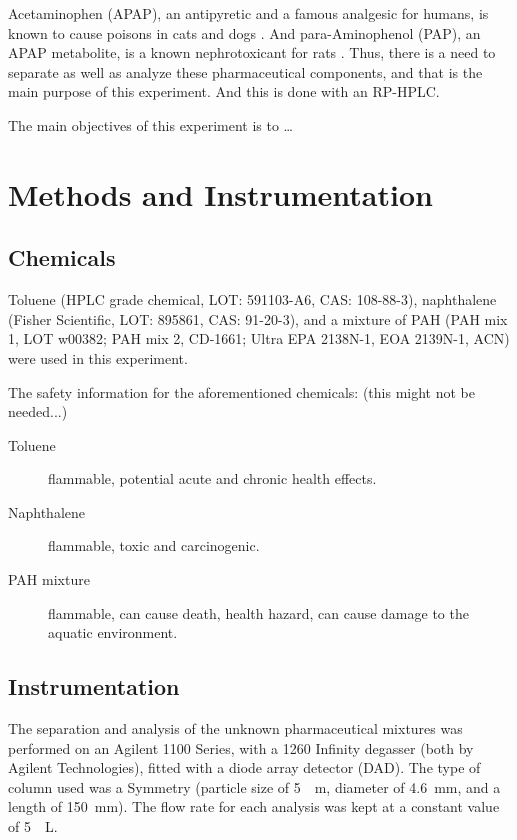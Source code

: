 \documentclass[a4paper, 12pt]{article}
\begin{document}
Acetaminophen (APAP), an antipyretic and a famous analgesic for humans, is known to cause poisons in cats and dogs \cite{dogs-cats}. And para-Aminophenol (PAP), an APAP metabolite, is a known nephrotoxicant for rats \cite{rats}. Thus, there is a need to separate as well as analyze these pharmaceutical components, and that is the main purpose of this experiment. And this is done with an RP-HPLC.

The main objectives of this experiment is to \ldots{}


\section{Methods and Instrumentation}

\subsection{Chemicals}
Toluene (HPLC grade chemical, LOT: 591103-A6, CAS: 108-88-3), naphthalene (Fisher Scientific, LOT: 895861, CAS: 91-20-3), and a mixture of PAH (PAH mix 1, LOT w00382; PAH mix 2, CD-1661; Ultra EPA 2138N-1, EOA 2139N-1, ACN) were used in this experiment.

The safety information for the aforementioned chemicals: (this might not be needed...)
\begin{description}
	\item[Toluene] flammable, potential acute and chronic health effects.
	\item[Naphthalene] flammable, toxic and carcinogenic.
	\item[PAH mixture] flammable, can cause death, health hazard, can cause damage to the aquatic environment.
\end{description}

\subsection{Instrumentation}
The separation and analysis of the unknown pharmaceutical mixtures was performed on an Agilent 1100 Series, with a 1260 Infinity degasser (both by Agilent Technologies), fitted with a diode array detector (DAD). The type of column used was a Symmetry\textregistered{}  (particle size of \SI{5}{\mu{}m}, diameter of \SI{4.6}{mm}, and a length of \SI{150}{mm}). The flow rate for each analysis was kept at a constant value of \SI{5}{\mu{}L}.
\end{document}
